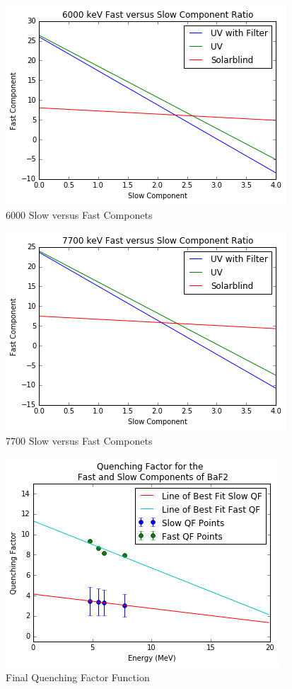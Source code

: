 \documentclass[aip, jmp, amssymb, amsmath, reprint, floatfix]{revtex4-1}
\begin{document}
\begin{figure}
  \centering
    \includegraphics[width=.8\columnwidth]{third.png}
  \caption{6000 Slow versus Fast Componets}
  \label{fig:third}
\end{figure} 

\begin{figure}
  \centering
    \includegraphics[width=.8\columnwidth]{fourth.png}
  \caption{7700 Slow versus Fast Componets}
  \label{fig:fourth}
\end{figure} 


\begin{figure}
  \centering
    \includegraphics[width=.8\columnwidth]{qf.png}
  \caption{Final Quenching Factor Function}
  \label{fig:qf}
\end{figure} 
\end{document}
